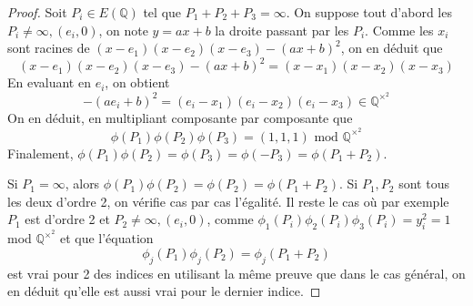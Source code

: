 \documentclass{article}
\begin{document}
\begin{proof}
Soit $P_{i} \in E(\mathbb{Q})$ tel que $P_{1} + P_{2} + P_{3} = \infty$. On suppose tout d'abord les
$P_{i} \neq \infty, (e_{i}, 0)$, on note $y=ax+b$ la droite passant par les $P_{i}$. Comme les
$x_{i}$ sont racines de $(x-e_{1})(x-e_{2})(x-e_{3})-(ax+b)^2$, on en déduit que
\begin{equation*}
(x-e_{1})(x-e_{2})(x-e_{3}) - (ax+b)^2 = (x-x_{1})(x-x_{2})(x-x_{3})
\end{equation*}
En evaluant en $e_{i}$, on obtient
\begin{equation*}
-(ae_{i}+b)^2 = (e_{i}-x_{1})(e_{i}-x_{2})(e_{i}-x_{3}) \in \mathbb{Q}^{\times^2}
\end{equation*}
On en déduit, en multipliant composante par composante que
\begin{equation*}
\phi(P_{1})\phi(P_{2})\phi(P_{3}) = (1, 1, 1) \text{ mod } \mathbb{Q}^{\times^2}
\end{equation*}
Finalement, $\phi(P_{1})\phi(P_{2}) = \phi(P_{3}) = \phi(-P_{3}) = \phi(P_{1}+P_{2})$.

Si $P_{1} = \infty$, alors $\phi(P_{1})\phi(P_{2}) = \phi(P_{2}) = \phi(P_{1}+P_{2})$. 
Si $P_{1},P_{2}$ sont tous les deux d'ordre 2, on vérifie cas par cas l'égalité. 
Il reste le cas où par exemple $P_{1}$ est d'ordre 2 et $P_{2} \neq \infty, (e_{i}, 0)$, comme 
$\phi_{1}(P_{i})\phi_{2}(P_{i})\phi_{3}(P_{i}) = y_{i}^2 = 1$ mod $\mathbb{Q}^{\times^2}$ et que l'équation
\begin{equation*}
\phi_{j}(P_{1})\phi_{j}(P_{2}) = \phi_{j}(P_{1}+P_{2})
\end{equation*}
est vrai pour 2 des indices en utilisant la même preuve que dans le cas général, 
on en déduit qu'elle est aussi vrai pour le dernier indice.


\end{proof}
\end{document}
